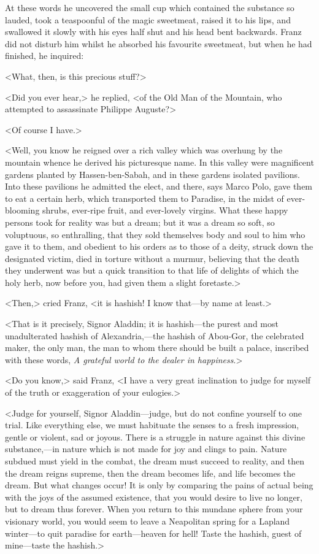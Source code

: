  At these words he uncovered the small cup which contained the substance so lauded, took a teaspoonful of the magic sweetmeat, raised it to his lips, and swallowed it slowly with his eyes half shut and his head bent backwards. Franz did not disturb him whilst he absorbed his favourite sweetmeat, but when he had finished, he inquired: 

 <What, then, is this precious stuff?> 

 <Did you ever hear,> he replied, <of the Old Man of the Mountain, who attempted to assassinate Philippe Auguste?> 

 <Of course I have.> 

 <Well, you know he reigned over a rich valley which was overhung by the mountain whence he derived his picturesque name. In this valley were magnificent gardens planted by Hassen-ben-Sabah, and in these gardens isolated pavilions. Into these pavilions he admitted the elect, and there, says Marco Polo, gave them to eat a certain herb, which transported them to Paradise, in the midst of ever-blooming shrubs, ever-ripe fruit, and ever-lovely virgins. What these happy persons took for reality was but a dream; but it was a dream so soft, so voluptuous, so enthralling, that they sold themselves body and soul to him who gave it to them, and obedient to his orders as to those of a deity, struck down the designated victim, died in torture without a murmur, believing that the death they underwent was but a quick transition to that life of delights of which the holy herb, now before you, had given them a slight foretaste.> 

 <Then,> cried Franz, <it is hashish! I know that—by name at least.> 

 <That is it precisely, Signor Aladdin; it is hashish—the purest and most unadulterated hashish of Alexandria,—the hashish of Abou-Gor, the celebrated maker, the only man, the man to whom there should be built a palace, inscribed with these words, \textit{A grateful world to the dealer in happiness}.> 

 <Do you know,> said Franz, <I have a very great inclination to judge for myself of the truth or exaggeration of your eulogies.> 

 <Judge for yourself, Signor Aladdin—judge, but do not confine yourself to one trial. Like everything else, we must habituate the senses to a fresh impression, gentle or violent, sad or joyous. There is a struggle in nature against this divine substance,—in nature which is not made for joy and clings to pain. Nature subdued must yield in the combat, the dream must succeed to reality, and then the dream reigns supreme, then the dream becomes life, and life becomes the dream. But what changes occur! It is only by comparing the pains of actual being with the joys of the assumed existence, that you would desire to live no longer, but to dream thus forever. When you return to this mundane sphere from your visionary world, you would seem to leave a Neapolitan spring for a Lapland winter—to quit paradise for earth—heaven for hell! Taste the hashish, guest of mine—taste the hashish.> 

